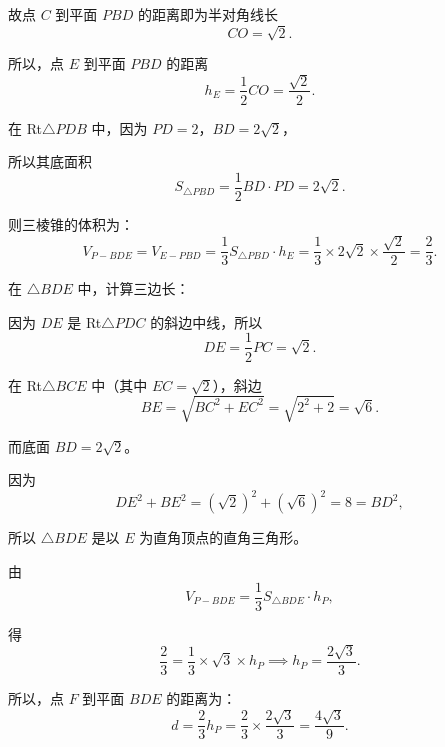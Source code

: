 {  故点 $C$ 到平面 $PBD$ 的距离即为半对角线长
  \[ CO = \sqrt{2}. \]
  
  所以，点 $E$ 到平面 $PBD$ 的距离
  \[ h_E = \frac{1}{2}CO = \frac{\sqrt{2}}{2}. \]
  
  在 Rt$\triangle PDB$ 中，因为 $PD = 2$，$BD = 2\sqrt{2}$，
  
  所以其底面积
  \[ S_{\triangle PBD} = \frac{1}{2} BD \cdot PD = 2\sqrt{2}. \]
  
  则三棱锥的体积为：
  \[ V_{P-BDE} = V_{E-PBD} = \frac{1}{3} S_{\triangle PBD} \cdot h_E = \frac{1}{3} \times 2\sqrt{2} \times \frac{\sqrt{2}}{2} = \frac{2}{3}. \]
  
  在 $\triangle BDE$ 中，计算三边长：
  
  因为 $DE$ 是 Rt$\triangle PDC$ 的斜边中线，所以
  \[ DE = \frac{1}{2}PC = \sqrt{2}. \]
  
  在 Rt$\triangle BCE$ 中（其中 $EC = \sqrt{2}$），斜边
  \[ BE = \sqrt{BC^2 + EC^2} = \sqrt{2^2 + 2} = \sqrt{6}. \]
  
  而底面 $BD = 2\sqrt{2}$。
  
  因为
  \[ DE^2 + BE^2 = (\sqrt{2})^2 + (\sqrt{6})^2 = 8 = BD^2, \]
  
  所以 $\triangle BDE$ 是以 $E$ 为直角顶点的直角三角形。
  
  由
  \[ V_{P-BDE} = \frac{1}{3} S_{\triangle BDE} \cdot h_P, \]
  
  得
  \[ \frac{2}{3} = \frac{1}{3} \times \sqrt{3} \times h_P \implies h_P = \frac{2\sqrt{3}}{3}. \]
  
  所以，点 $F$ 到平面 $BDE$ 的距离为：
  \[ d = \frac{2}{3} h_P = \frac{2}{3} \times \frac{2\sqrt{3}}{3} = \frac{4\sqrt{3}}{9}. \]
}

\newcommand{\qSolidPyramidPointDistanceDiagnosis}{%
  本题难点不在单纯计算，而在于两个比例结构的识别：
  其一，$EF\perp BP$ 表示 $F$ 是 $E$ 在 $BP$ 上的垂足，需要在 Rt$\triangle PBC$ 中通过投影关系确定
  $\frac{BF}{BP}=\frac{2}{3}$；
  其二，因 $B\in$ 平面 $BDE$，且 $F,P,B$ 共线，点到平面 $BDE$ 的距离沿直线 $BP$ 成线性比例，
  即 $d(F,\text{平面 }BDE)=\frac{BF}{BP}d(P,\text{平面 }BDE)$。
  常见误区是直接陷入复杂点面距离计算，而没有先利用比例降维。
}

\newcommand{\qSolidPyramidPointDistanceTeachingNotes}{%
  \item \textbf{重难点解析}：
    \begin{itemize}
      \item 本题有两种稳定方法：坐标向量法和空间比例法。坐标法最稳，设
      $D(0,0,0)$，$C(2,0,0)$，$B(2,2,0)$，$P(0,0,2)$，
      可快速求出 $F$ 坐标和平面 $BDE$ 的法向量。
      \item 几何法的关键是先把 $EF\perp BP$ 理解为投影关系。在 Rt$\triangle PBC$ 中，
      $F$ 是 $E$ 到 $BP$ 的垂足，由投影可得 $PF=\frac13BP$，从而
      $BF:BP=2:3$。
      \item 第二个关键是距离比例：因为 $B\in$ 平面 $BDE$，且 $F,P,B$ 共线，
      所以点到平面 $BDE$ 的距离沿 $BP$ 成比例变化，
      $d_F=\frac{BF}{BP}d_P$。
      \item 求 $d_P$ 时使用等体积法：
      $V_{P-BDE}=V_{E-PBD}$。其中 $E$ 是 $PC$ 中点，因此
      $d(E,\text{平面 }PBD)=\frac12 d(C,\text{平面 }PBD)$。
    \end{itemize}
}
